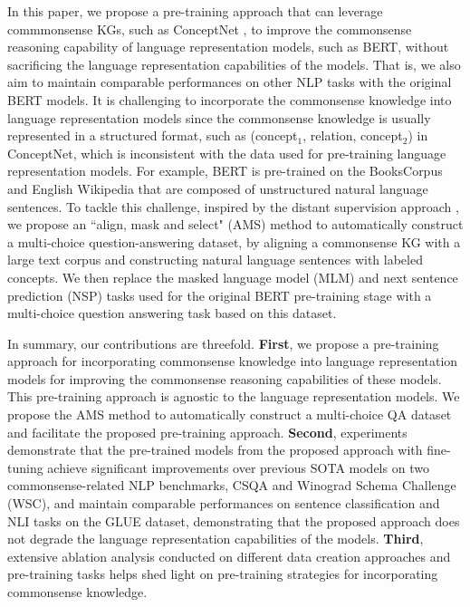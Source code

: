 \documentclass[11pt,a4paper]{article}
\begin{document}
In this paper, we propose a pre-training approach that can leverage commmonsense KGs, such as ConceptNet \citep{speer2017conceptnet}, to improve the commonsense reasoning capability of language representation models, such as BERT, without sacrificing the language representation capabilities of the models. 
That is, we also aim to maintain comparable performances on other NLP tasks with the original BERT models. 
It is challenging to incorporate the commonsense knowledge into language representation models since the commonsense knowledge is usually represented in a structured format, such as (concept$_1$, relation, concept$_2$) in ConceptNet, which is inconsistent with the data used for pre-training language representation models.
For example, BERT is pre-trained on the BooksCorpus and English Wikipedia that are composed of unstructured natural language sentences.
To tackle this challenge, inspired by the distant supervision approach \citep{mintz-etal-2009-distant}, we propose an ``align, mask and select" (AMS) method to automatically construct a multi-choice question-answering dataset, by aligning a commonsense KG with a large text corpus and constructing natural language sentences with labeled concepts. We then replace the masked language model (MLM) and next sentence prediction (NSP) tasks used for the original BERT pre-training stage with a multi-choice question answering task based on this dataset.




In summary, our contributions are threefold.
\textbf{First}, we propose a pre-training approach for incorporating commonsense knowledge into language representation models for improving the commonsense reasoning capabilities of these models. This pre-training approach is agnostic to the language representation models. We propose the AMS method to automatically construct a multi-choice QA dataset and facilitate the proposed pre-training approach.
\textbf{Second}, experiments demonstrate that the pre-trained models from the proposed approach with fine-tuning achieve significant improvements over previous SOTA models on two commonsense-related NLP benchmarks, CSQA and Winograd Schema Challenge (WSC), and maintain comparable performances on sentence classification and NLI tasks on the GLUE dataset, demonstrating that the proposed approach does not degrade the language representation capabilities of the models.
\textbf{Third}, extensive ablation analysis conducted on different data creation approaches and pre-training tasks helps shed light on pre-training strategies for incorporating commonsense knowledge.
\end{document}
